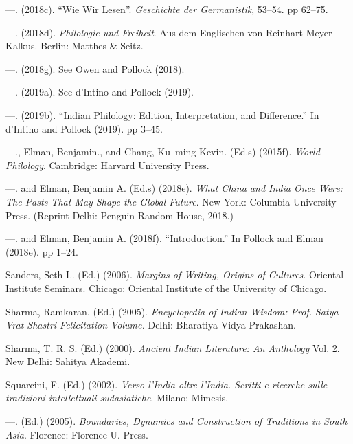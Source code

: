  \item —. (2018c). “Wie Wir Lesen”. \textit{Geschichte der Germanistik}, 53–54. pp 62–75.

 \item —. (2018d). \textit{Philologie und Freiheit}. Aus dem Englischen von Reinhart Meyer–Kalkus. Berlin: Matthes \& Seitz.

 \item —. (2018g). See Owen and Pollock (2018).

 \item —. (2019a). See d’Intino and Pollock (2019).

 \item —. (2019b). “Indian Philology: Edition, Interpretation, and Difference.” In d’Intino and Pollock (2019). pp 3–45.

 \item —., Elman, Benjamin., and Chang, Ku–ming Kevin. (Ed.s) (2015f).\textit{ World Philology}. Cambridge: Harvard University Press.

 \item —. and Elman, Benjamin A. (Ed.s) (2018e). \textit{What China and India Once Were: The Pasts That May Shape the Global Future}. New York: Columbia University Press. (Reprint Delhi: Penguin Random House, 2018.)

 \item —. and Elman, Benjamin A. (2018f). “Introduction.” In Pollock and Elman (2018e). pp 1–24.

 \item Sanders, Seth L. (Ed.) (2006). \textit{Margins of Writing, Origins of Cultures}. Oriental Institute Seminars. Chicago: Oriental Institute of the University of Chicago.

 \item Sharma, Ramkaran. (Ed.) (2005). \textit{Encyclopedia of Indian Wisdom: Prof. Satya Vrat Shastri Felicitation Volume.} Delhi: Bharatiya Vidya Prakashan.

 \item Sharma, T. R. S. (Ed.) (2000). \textit{Ancient Indian Literature: An Anthology} Vol. 2. New Delhi: Sahitya Akademi.

 \item Squarcini, F. (Ed.) (2002). \textit{Verso l’India oltre l’India. Scritti e ricerche sulle tradizioni intellettuali sudasiatiche}. Milano: Mimesis.

 \item —. (Ed.) (2005). \textit{Boundaries, Dynamics and Construction of Traditions in South Asia}. Florence: Florence U. Press.

